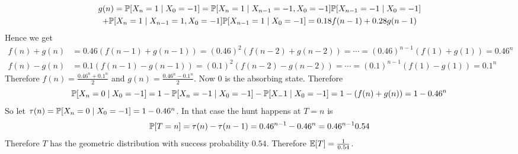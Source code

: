 \documentclass[a4paper, 11pt]{article}
\begin{document}
{\begin{enumerate}[label=(\alph*)]
\begin{multline*}
	g(n)=\mathbb{P}[X_n=1\mid X_0=-1]=\mathbb{P}[X_n=1\mid X_{n-1}=-1,X_0=-1]\mathbb{P}[X_{n-1}=-1\mid X_0=-1]\\
	+\mathbb{P}[X_n=1\mid X_{n-1}=1,X_0=-1]\mathbb{P}[X_{n-1}=1\mid X_0=-1]=0.18f(n-1)+0.28g(n-1)
\end{multline*}Hence we get \begin{align*}
f(n)+g(n)&=0.46(f(n-1)+g(n-1))=(0.46)^2(f(n-2)+g(n-2))=\cdots =(0.46)^{n-1}(f(1)+g(1))=0.46^n\\
f(n)-g(n)& = 0.1(f(n-1)-g(n-1))=(0.1)^2(f(n-2)-g(n-2))=\cdots =(0.1)^{n-1}(f(1)-g(1))=0.1^n
\end{align*}
Therefore $f(n)=\frac{0.46^n+0.1^n}2$ and $g(n)=\frac{0.46^n-0.1^n}2$. Now $0$ is the absorbing state. Therefore $$\mathbb{P}[X_n=0\mid X_0=-1]=1-\mathbb{P}[X_n=-1\mid X_0=-1]-\mathbb{P}[X_-1\mid X_0=-1]=1-(f(n)+g(n))=1-0.46^n$$So let $\tau(n)=\mathbb{P}[X_n=0\mid X_0=-1]=1-0.46^n$. In that case the hunt happens at $T=n$ is $$\mathbb{P}[T=n]=\tau(n)-\tau(n-1)=0.46^{n-1}-0.46^n=0.46^{n-1}0.54$$Therefore $T$ has the geometric distribution with success probability $0.54$. Therefore $\mathbb{E}[T]=\frac1{0.54}$. 
\end{enumerate}
}


\end{document}
